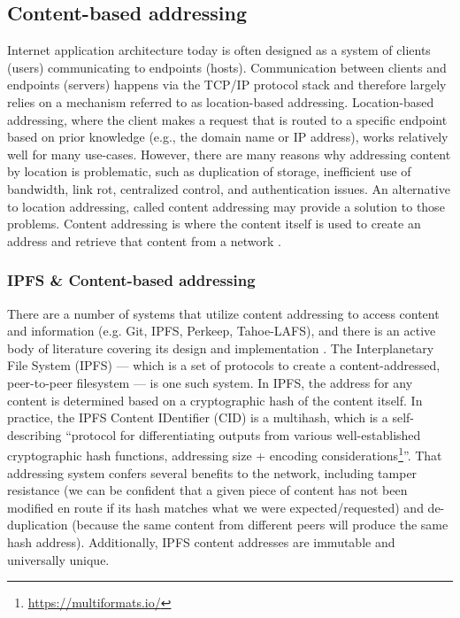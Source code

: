 \documentclass{textile}
\begin{document}
\subsection{Content-based addressing}

Internet application architecture today is often designed as a system of clients (users) communicating to endpoints (hosts). Communication between clients and endpoints (servers) happens via the TCP/IP protocol stack and therefore largely relies on a mechanism referred to as location-based addressing. Location-based addressing, where the client makes a request that is routed to a specific endpoint based on prior knowledge (e.g., the domain name or IP address), works relatively well for many use-cases. However, there are many reasons why addressing content by location is problematic, such as duplication of storage, inefficient use of bandwidth, link rot, centralized control, and authentication issues. An alternative to location addressing, called content addressing may provide a solution to those problems. Content addressing is where the content itself is used to create an address and retrieve that content from a network \cite{mortContentBasedAddressing2012}.

\subsubsection{IPFS \& Content-based addressing}

There are a number of systems that utilize content addressing to access content and information (e.g. Git, IPFS, Perkeep, Tahoe-LAFS), and there is an active body of literature covering its design and implementation \cite{benetIPFSContentAddressed2014,selimi_tahoeLafs_2014,rhea_fast_2008}. The Interplanetary File System (IPFS) --- which is a set of protocols to create a content-addressed, peer-to-peer filesystem \cite{benetIPFSContentAddressed2014} --- is one such system. In IPFS, the address for any content is determined based on a cryptographic hash of the content itself. In practice, the IPFS Content IDentifier (CID) is a multihash, which is a self-describing ``protocol for differentiating outputs from various well-established cryptographic hash functions, addressing size + encoding considerations\footnote{\url{https://multiformats.io/}}''. That addressing system confers several benefits to the network, including tamper resistance (we can be confident that a given piece of content has not been modified en route if its hash matches what we were expected/requested) and de-duplication (because the same content from different peers will produce the same hash address). Additionally, IPFS content addresses are immutable and universally unique.
\end{document}

